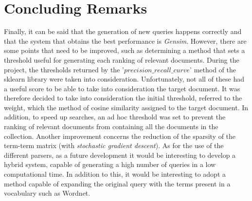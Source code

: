 \section*{Concluding Remarks}
Finally, it can be said that the generation of new queries happens correctly 
and that the system that obtains the best performance is \emph{Gensim}. However, 
there are some points that need to be improved, such as determining 
a method that sets a threshold useful for generating each ranking of 
relevant documents. During the project, the thresholds returned by the 
'$precision\_recall\_curve$' method of the sklearn library were taken into consideration. 
Unfortunately, not all of these had a useful score to be able to take 
into consideration the target document. It was therefore decided to take into 
consideration the initial threshold, referred to the weight, which the method 
of cosine similarity assigned to the target document. In addition, to speed 
up searches, an ad hoc threshold was set to prevent the ranking of relevant 
documents from containing all the documents in the collection. Another improvement 
concerns the reduction of the sparsity of the term-term matrix 
(with \emph{stochastic gradient descent}). As for the use of the different parsers, 
as a future development it would be interesting to develop a hybrid system, 
capable of generating a high number of queries in a low computational time. 
In addition to this, it would be interesting to adopt a method capable of 
expanding the original query with the terms present in a vocabulary such as 
Wordnet.